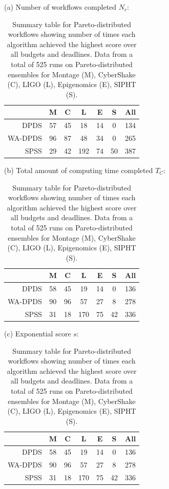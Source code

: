 \documentclass{sig-alternate}
\begin{document}

\begin{table}[tb]
\centering

(a) Number of workflows completed $N_c$:
\medskip
\begin{tabular}{r|cccccc}
 & M & C & L & E & S & All\tabularnewline
\hline
DPDS      &   57  & 45 &  18 &  14  &  0 & 134\tabularnewline
WA-DPDS   &    96 &  87  & 48  & 34  &  0 & 265\tabularnewline
SPSS     &    29  & 42  & 192  & 74  & 50 & 387\tabularnewline
\end{tabular}
\medskip

(b) Total amount of computing time completed $T_C$:
\medskip
\begin{tabular}{r|cccccc}
 & M & C & L & E & S & All\tabularnewline
\hline
DPDS      &   58  & 45 &  19 &  14  &  0 & 136\tabularnewline
WA-DPDS   &    90  & 96  & 57  & 27 &   8 & 278\tabularnewline
SPSS     &    31 &  18 &  170  & 75 &  42 & 336\tabularnewline
\end{tabular}
\medskip

(c) Exponential score $s$:
\medskip
\begin{tabular}{r|cccccc}
 & M & C & L & E & S & All\tabularnewline
\hline
DPDS      &   58  & 45 &  19 &  14  &  0 & 136\tabularnewline
WA-DPDS   &    90  & 96  & 57  & 27 &   8 & 278\tabularnewline
SPSS     &    31 &  18 &  170  & 75 &  42 & 336\tabularnewline
\end{tabular}
\medskip

\caption{Summary table for Pareto-distributed workflows showing number of times
each algorithm achieved the highest score over all budgets and deadlines. Data from a total of 525 runs on 
Pareto-distributed ensembles for Montage (M), CyberShake (C), LIGO (L), 
Epigenomics (E), SIPHT (S).
\label{tab:num-dags-pareto}}
\end{table}

\end{document}
